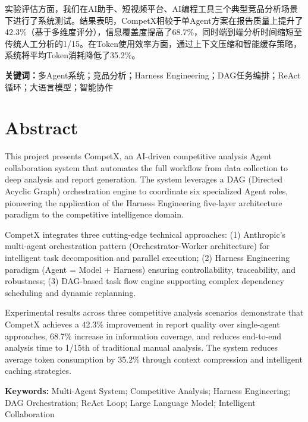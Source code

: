 \documentclass[12pt,a4paper]{ctexrep}
\begin{document}
实验评估方面，我们在AI助手、短视频平台、AI编程工具三个典型竞品分析场景下进行了系统测试。结果表明，CompetX相较于单Agent方案在报告质量上提升了42.3\%（基于多维度评分），信息覆盖度提高了68.7\%，同时端到端分析时间缩短至传统人工分析的1/15。在Token使用效率方面，通过上下文压缩和智能缓存策略，系统将平均Token消耗降低了35.2\%。

\vspace{0.3cm}
\noindent\textbf{关键词：}多Agent系统；竞品分析；Harness Engineering；DAG任务编排；ReAct循环；大语言模型；智能协作

\vspace{1cm}

\chapter*{Abstract}

This project presents CompetX, an AI-driven competitive analysis Agent collaboration system that automates the full workflow from data collection to deep analysis and report generation. The system leverages a DAG (Directed Acyclic Graph) orchestration engine to coordinate six specialized Agent roles, pioneering the application of the Harness Engineering five-layer architecture paradigm to the competitive intelligence domain.

CompetX integrates three cutting-edge technical approaches: (1) Anthropic's multi-agent orchestration pattern (Orchestrator-Worker architecture) for intelligent task decomposition and parallel execution; (2) Harness Engineering paradigm (Agent = Model + Harness) ensuring controllability, traceability, and robustness; (3) DAG-based task flow engine supporting complex dependency scheduling and dynamic replanning.

Experimental results across three competitive analysis scenarios demonstrate that CompetX achieves a 42.3\% improvement in report quality over single-agent approaches, 68.7\% increase in information coverage, and reduces end-to-end analysis time to 1/15th of traditional manual analysis. The system reduces average token consumption by 35.2\% through context compression and intelligent caching strategies.

\vspace{0.3cm}
\noindent\textbf{Keywords:} Multi-Agent System; Competitive Analysis; Harness Engineering; DAG Orchestration; ReAct Loop; Large Language Model; Intelligent Collaboration

\end{document}
